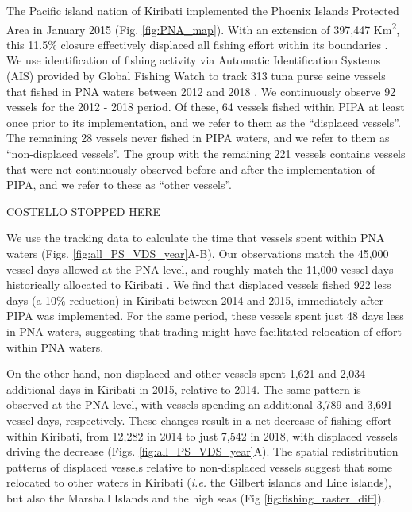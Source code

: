 \documentclass[12pt]{article}
\begin{document}
The Pacific island nation of Kiribati implemented the Phoenix Islands Protected Area in January 2015 (Fig. \ref{fig:PNA_map}). With an extension of 397,447 Km\textsuperscript{2}, this 11.5\% closure effectively displaced all fishing effort within its boundaries \cite{mccauley_2016,mcdermott_2018}. We use identification of fishing activity via Automatic Identification Systems (AIS) provided by Global Fishing Watch to track 313 tuna purse seine vessels that fished in PNA waters between 2012 and 2018 \cite{kroodsma_2018}. We continuously observe 92 vessels for the 2012 - 2018 period. Of these, 64 vessels fished within PIPA at least once prior to its implementation, and we refer to them as the ``displaced vessels''. The remaining 28 vessels never fished in PIPA waters, and we refer to them as ``non-displaced vessels''. The group with the remaining 221 vessels contains vessels that were not continuously observed before and after the implementation of PIPA, and we refer to these as ``other vessels''.


COSTELLO STOPPED HERE

We use the tracking data to calculate the time that vessels spent within PNA waters (Figs. \ref{fig:all_PS_VDS_year}A-B). Our observations match the 45,000 vessel-days allowed at the PNA level, and roughly match the 11,000 vessel-days historically allocated to Kiribati \cite{yeeting2018stabilising}. We find that displaced vessels fished 922 less days (a 10\% reduction) in Kiribati between 2014 and 2015, immediately after PIPA was implemented. For the same period, these vessels spent just 48 days less in PNA waters, suggesting that trading might have facilitated relocation of effort within PNA waters.

On the other hand, non-displaced and other vessels spent 1,621 and 2,034 additional days in Kiribati in 2015, relative to 2014. The same pattern is observed at the PNA level, with vessels spending an additional 3,789 and 3,691 vessel-days, respectively. These changes result in a net decrease of fishing effort within Kiribati, from 12,282 in 2014 to just 7,542 in 2018, with displaced vessels driving the decrease (Figs. \ref{fig:all_PS_VDS_year}A). The spatial redistribution patterns of displaced vessels relative to non-displaced vessels suggest that some relocated to other waters in Kiribati (\emph{i.e.} the Gilbert islands and Line islands), but also the Marshall Islands and the high seas (Fig \ref{fig:fishing_raster_diff}).
\end{document}
